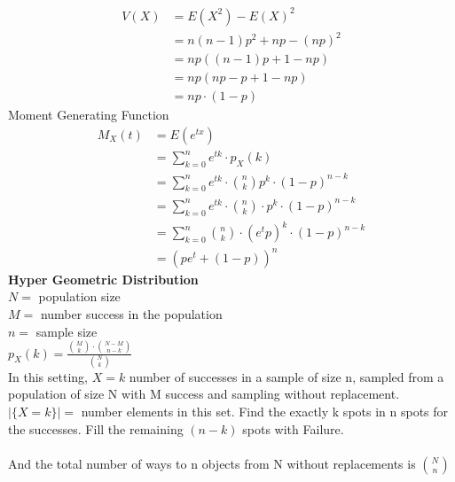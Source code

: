 \documentclass[11pt,oneside]{book}
\theoremstyle{break}
\theoremstyle{break}
\begin{document}
\begin{align*}
V(X)&=E(X^2)-E(X)^2\\
&=n(n-1)p^2+np-(np)^2\\
&=np((n-1)p+1-np)\\
&=np(np-p+1-np)\\
&=np\cdot (1-p)
\end{align*}
Moment Generating Function \begin{align*}
M_X(t)&=E(e^{tx})\\
&=\sum_{k=0}^n e^{tk}\cdot p_X(k)\\
&=\sum_{k=0}^{n}e^{tk}\cdot \binom nk p^k\cdot (1-p)^{n-k}\\
&=\sum_{k=0}^{n}e^{tk} \cdot \binom nk \cdot p^k\cdot (1-p)^{n-k}\\
&=\sum_{k=0}^{n}\binom nk  \cdot (e^tp)^k\cdot (1-p)^{n-k}\\
&=(pe^t+(1-p))^n
\end{align*}
\textbf{Hyper Geometric Distribution}\\
$N=$ population size\\
$M=$ number success in the population\\
$n=$ sample size\\
$p_X(k)=\frac{\binom Mk \cdot \binom{N-M}{n-k}}{\binom{N}{k}}$\\
In this setting, $X=k$ number of successes in a sample of size n, sampled from a population of size N with M success and sampling without replacement.\\
$|\{X=k\}|=$ number elements in this set.
Find the exactly k spots in n spots for the successes. Fill the remaining $(n-k)$ spots with Failure.\\
\hfill\\
And the total number of ways to n objects from N without replacements is $\binom Nn$
\newpage
\end{document}
